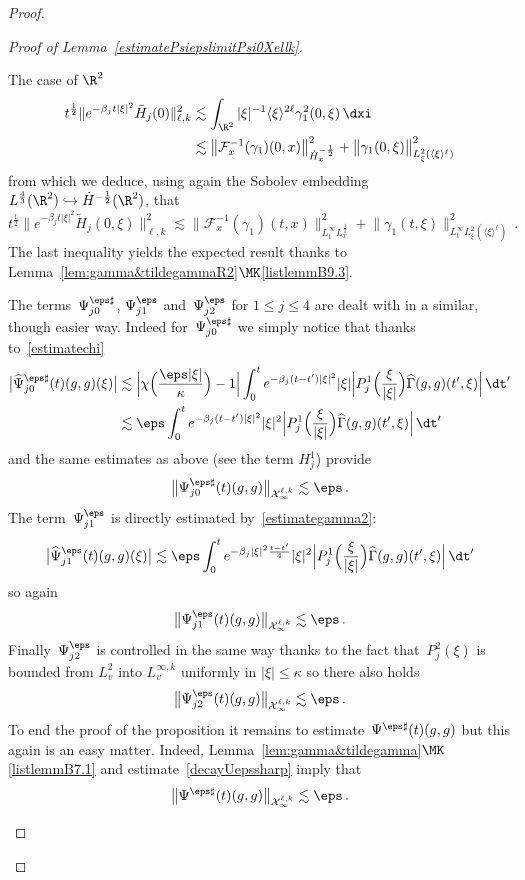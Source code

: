 \begin{proof}
\begin{proof}[{Proof of Lemma~\ref{estimatePsiepslimitPsi0Xellk}}]
\begin{step}{The case of $\R^2$}
\begin{align*}
t^{\frac12}\|e^{- \beta_j t |\xi|^2}\tilde H_j(0) \|^2_{\ell,k} &\lesssim \int_{\R^2} |\xi|^{-1} \langle \xi \rangle^{2\ell} \gamma_1^2(0,\xi) \, \dxi \\
&\lesssim {\big\| \mathcal{F}_x^{-1}(\gamma_1)(0,x) \big\|_{\dot H^{-\frac12}_x} ^2+ \big\| \gamma_1(0,\xi)\big\|_{L^2_\xi(\langle \xi \rangle^\ell)}^2}
\end{align*}
from which we deduce, using again the Sobolev embedding~$L^\frac43(\R^2)\hookrightarrow \dot H^{-\frac12}(\R^2)$, that
\[
t^{\frac12}\|e^{- \beta_j t |\xi|^2}\tilde H_j(0,\xi) \|^2_{\ell,k} \lesssim{\big \|\mathcal{F}_x^{-1}(\gamma_1)(t,x)\big\|_{L^\infty_t L^{\frac43}_x}^2 +\big \| \gamma_1(t,\xi)\big\|_{L^\infty_t L^2_\xi(\langle \xi \rangle^\ell) }^2}\,.
\]
The last inequality yields the expected result thanks to Lemma~\ref{lem:gamma&tildegammaR2}$\MK$\eqref{listlemmB9.3}.

The terms~$ \Psi^{\eps\sharp}_{j0}$, $ \Psi^\eps_{j1}$ and~$ \Psi^\eps_{j2}$ for $1 \le j \le 4$ are dealt with in a similar, though easier way. Indeed for~$ \Psi^{\eps\sharp}_{j0}$ we simply notice that thanks to~\eqref{estimatechi}
\begin{align*}
\big |\widehat\Psi^{\eps\sharp}_{j0}(t)(g,g)(\xi)\big| & \lesssim\Big|\chi\Big (\frac{\eps|\xi|}\kappa\Big)-1\Big| \int_0^te^{- \beta_j (t-t') |\xi|^2}|\xi| \Big| P_{j}^1\Big(\frac{\xi}{|\xi|}\Big) \widehat {\Gamma}(g,g)(t',\xi) \Big| \, \dt'\\
& \lesssim \eps \int_0^te^{- \beta_j (t-t') |\xi|^2}|\xi| ^2 \Big| P_{j}^1\Big(\frac{\xi}{|\xi|}\Big) \widehat {\Gamma}(g,g)(t',\xi) \Big| \, \dt'
\end{align*}
and the same estimates as above (see the term $H^1_j$) provide
\[
\big\| \Psi^{\eps\sharp}_{j0}(t)(g,g)\big\|_{\mathcal{X}_\infty^{\ell,k}}\lesssim \eps\,.
\]
The term~$\Psi^\eps_{j1}$ is directly estimated by~\eqref{estimategamma2}:
\[
\big |\widehat\Psi^{\eps}_{j1}(t)(g,g)(\xi)\big| \lesssim \eps \int_0^te^{- \beta_j |\xi|^2\frac{{t-t'}}{4}}|\xi| ^2 \Big| P_{j}^1\Big(\frac{\xi}{|\xi|}\Big) \widehat {\Gamma}(g,g)(t',\xi) \Big| \, \dt'
\]
so again
\[
\big\| \Psi^{\eps}_{j1}(t)(g,g)\big\|_{\mathcal{X}_\infty^{\ell,k}}\lesssim \eps\,.
\]
Finally~$\Psi^\eps_{j2}$ is controlled in the same way thanks to the fact that~$P_{j}^2(\xi)$ is bounded from $L^2_v$ into $L^{\infty,k}_v$ uniformly in $|\xi| \le \kappa$ so there also holds
\[
\big\| \Psi^{\eps}_{j2}(t)(g,g)\big\|_{\mathcal{X}_\infty^{\ell,k}}\lesssim \eps\,.
\]
To end the proof of the proposition it remains to estimate~$ \Psi^{\eps \sharp}(t)(g,g)$ but this again is an easy matter. Indeed, Lemma~\ref{lem:gamma&tildegamma}$\MK$\eqref{listlemmB7.1} and estimate~\eqref{decayUepssharp} imply that
\[
\big\| \Psi^{\eps\sharp}(t)(g,g)\big\|_{\mathcal{X}_\infty^{\ell,k}} \lesssim \eps\,.
\]
\end{step}


\end{proof}
\end{proof}
